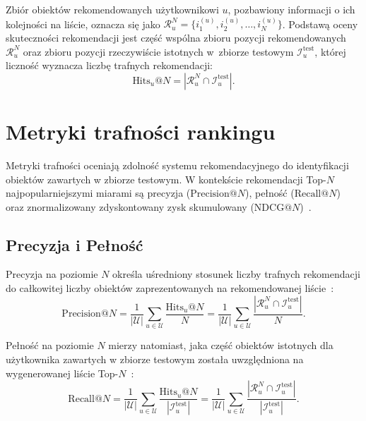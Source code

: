Zbiór obiektów rekomendowanych użytkownikowi $u$, pozbawiony informacji o ich kolejności na liście, oznacza się jako $\mathcal{R}_u^N = \{ i_1^{(u)}, i_2^{(u)}, \dots, i_N^{(u)} \}$. Podstawą oceny skuteczności rekomendacji jest część wspólna zbioru pozycji
rekomendowanych $\mathcal{R}_u^N$ oraz zbioru pozycji rzeczywiście istotnych
w~zbiorze testowym $\mathcal{I}_u^{\text{test}}$, której liczność wyznacza
liczbę trafnych rekomendacji:
\begin{equation}
    \text{Hits}_u@N = \left| \mathcal{R}_u^N \cap \mathcal{I}_u^{\text{test}} \right|.
\end{equation}

\section{Metryki trafności rankingu}

Metryki trafności oceniają zdolność systemu rekomendacyjnego do identyfikacji obiektów zawartych w zbiorze testowym. W kontekście rekomendacji Top-$N$ najpopularniejszymi miarami są precyzja ($\text{Precision}@N$), pełność ($\text{Recall}@N$) oraz znormalizowany zdyskontowany zysk skumulowany ($\text{NDCG}@N$)~\cite{jannach2011recommender, aggarwal2016recommender}.

\subsection{Precyzja i Pełność}

Precyzja na poziomie $N$ określa uśredniony stosunek liczby trafnych rekomendacji do całkowitej liczby obiektów zaprezentowanych na rekomendowanej liście~\cite{jannach2011recommender}:
\begin{equation}
    \text{Precision}@N = \frac{1}{|\mathcal{U}|} \sum_{u \in \mathcal{U}} \frac{\text{Hits}_u@N}{N} = \frac{1}{|\mathcal{U}|} \sum_{u \in \mathcal{U}} \frac{\left| \mathcal{R}_u^N \cap \mathcal{I}_u^{\text{test}} \right|}{N}.
\end{equation}

Pełność na poziomie $N$ mierzy natomiast, jaka część obiektów istotnych dla użytkownika zawartych w zbiorze testowym została uwzględniona na wygenerowanej liście Top-$N$~\cite{jannach2011recommender}:
\begin{equation}
    \text{Recall}@N = \frac{1}{|\mathcal{U}|} \sum_{u \in \mathcal{U}} \frac{\text{Hits}_u@N}{\left| \mathcal{I}_u^{\text{test}} \right|} = \frac{1}{|\mathcal{U}|} \sum_{u \in \mathcal{U}} \frac{\left| \mathcal{R}_u^N \cap \mathcal{I}_u^{\text{test}} \right|}{\left| \mathcal{I}_u^{\text{test}} \right|}.
\end{equation}

